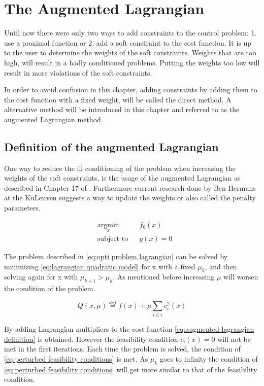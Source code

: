 \chapter{The Augmented Lagrangian}
Until now there were only two ways to add constraints to the control problem: 1. use a proximal function or 2. add a soft constraint to the cost function. It is up to the user to determine the weights of the soft constraints. Weights that are too high, will result in a badly conditioned problems. Putting the weights too low will result in more violations of the soft constraints.

In order to avoid confusion in this chapter, adding constraints by adding them to the cost function with a fixed weight, will be called the direct method. A alternative method will be introduced in this chapter and referred to as the augmented Lagrangian method.

\section{Definition of the augmented Lagrangian}
	One way to reduce the ill conditioning of the problem when increasing the weights of the soft constraints, is the usage of the augmented Lagrangian as described in Chapter 17 of \cite{Wright}. Furthermore current research done by Ben Hermans at the KuLeuven suggests a way to update the weights or also called the penalty parameters.
	
	\begin{equation}
		\begin{aligned}
			& \underset{x}{\text{argmin}}
			& & f_0(x) \\
			& \text{subject to}
			& & g(x)=0
		\end{aligned}
		\label{eq:opti problem lagrangian}
	\end{equation}
	
	The problem described in \eqref{eq:opti problem lagrangian} can be solved by minimizing \eqref{eq:lagrangian quadratic model}  for x with a fixed $\mu_k$, and then solving again for x with $\mu_{k+1}>\mu_k $. As mentioned before increasing $\mu$ will worsen the condition of the problem. 
	
	\begin{equation}
		Q(x,\mu) \overset{def}{=} f(x) + \mu \sum_{i \in \epsilon} c_i^2(x)
		\label{eq:lagrangian quadratic model}
	\end{equation}
	
	By adding Lagrangian multipliers to the cost function \eqref{eq:augmented lagrangian definition} is obtained. However the feasibility condition $c_i(x)=0$ will not be met in the first iterations. Each time the problem is solved, the condition of \eqref{eq:perturbed feasibility conditions} is met. As $\mu_k$ goes to infinity the condition of \eqref{eq:perturbed feasibility conditions} will get more similar to that of the feasibility condition.
	
